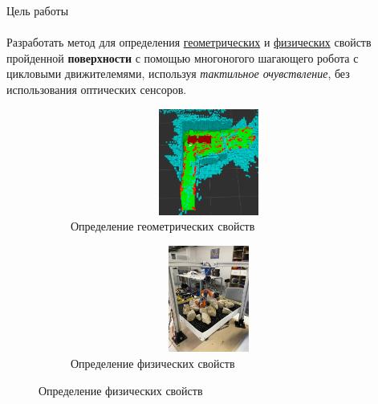 \documentclass[aspectratio=169,xcolor=table]{beamer}
\begin{document}
\begin{frame}[t]{Цель работы}
\framesubtitle{}
\vspace{-0.4cm}
    Разработать метод для определения \underline{геометрических} и \underline{физических} свойств пройденной \textbf{поверхности} с помощью многоногого шагающего робота с цикловыми движителемями, используя \textit{тактильное очувствление}, без использования оптических сенсоров.
\begin{figure}[H]
    \begin{subfigure}{0.49\textwidth}
        \centering\includegraphics[height=3.5cm,width=1\textwidth,keepaspectratio]{conv_concave.png}
        \caption*{Определение геометрических свойств}
    \end{subfigure}
    \begin{subfigure}{0.49\textwidth}
        \centering\includegraphics[height=3.5cm,width=1\textwidth,keepaspectratio]{s_shape_leg/view.jpg}
        \caption*{Определение физических свойств}
        \label{fig:s_shape_leg/view.jpg}
    \end{subfigure}
\end{figure}
\end{frame}
\end{document}
